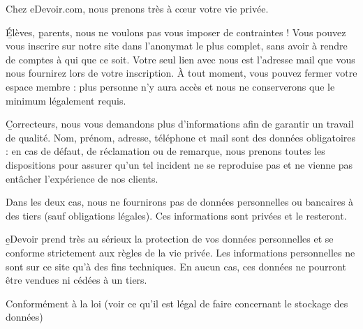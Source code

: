 Chez eDevoir.com, nous prenons très à cœur votre vie privée.

\b{Élèves}, \b{parents}, nous ne voulons pas vous imposer de contraintes ! Vous pouvez vous inscrire sur notre site dans l'anonymat le plus complet, sans avoir à rendre de comptes à qui que ce soit. Votre seul lien avec nous est l'adresse mail que vous nous fournirez lors de votre inscription. À tout moment, vous pouvez fermer votre espace membre : plus personne n'y aura accès et nous ne conserverons que le minimum légalement requis.

\b{Correcteurs}, nous vous demandons plus d'informations afin de garantir un travail de qualité.  Nom, prénom, adresse, téléphone et mail sont des données obligatoires : en cas de défaut, de réclamation ou de remarque, nous prenons toutes les dispositions pour assurer qu'un tel incident ne se reproduise pas et ne vienne pas entâcher l'expérience de nos clients.

Dans les deux cas, nous ne fournirons pas de données personnelles ou bancaires à des tiers (sauf obligations légales). Ces informations sont privées et le resteront.

\b{eDevoir} prend très au sérieux la protection de vos données personnelles et se conforme strictement aux règles de la vie privée. Les informations personnelles ne sont sur ce site qu'à des fins techniques. En aucun cas, ces données ne pourront être vendues ni cédées à un tiers.

Conformément à la loi (voir ce qu'il est légal de faire concernant le stockage des données)